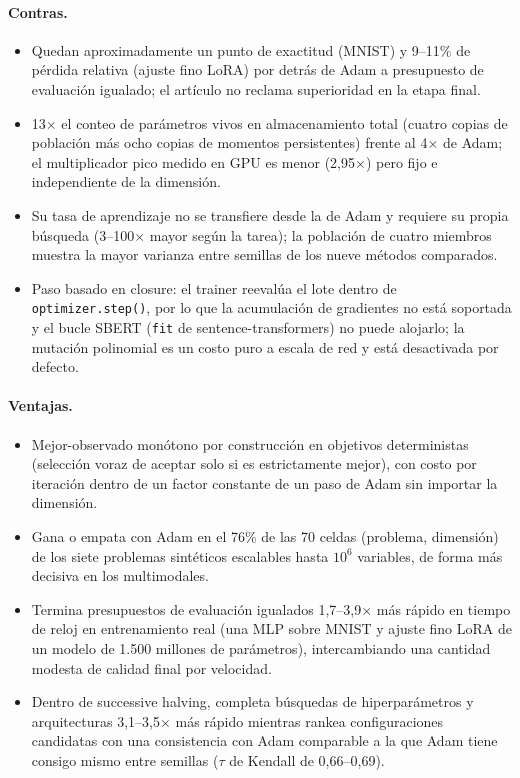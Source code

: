 \paragraph{Contras.}
\begin{itemize}[leftmargin=*]
\item Quedan aproximadamente un punto de exactitud (MNIST) y 9--11\% de pérdida relativa (ajuste fino LoRA) por detrás de Adam a presupuesto de evaluación igualado; el artículo no reclama superioridad en la etapa final.
\item 13$\times$ el conteo de parámetros vivos en almacenamiento total (cuatro copias de población más ocho copias de momentos persistentes) frente al 4$\times$ de Adam; el multiplicador pico medido en GPU es menor (2,95$\times$) pero fijo e independiente de la dimensión.
\item Su tasa de aprendizaje no se transfiere desde la de Adam y requiere su propia búsqueda (3--100$\times$ mayor según la tarea); la población de cuatro miembros muestra la mayor varianza entre semillas de los nueve métodos comparados.
\item Paso basado en closure: el trainer reevalúa el lote dentro de \texttt{optimizer.step()}, por lo que la acumulación de gradientes no está soportada y el bucle SBERT (\texttt{fit} de sentence-transformers) no puede alojarlo; la mutación polinomial es un costo puro a escala de red y está desactivada por defecto.
\end{itemize}

\paragraph{Ventajas.}
\begin{itemize}[leftmargin=*]
\item Mejor-observado monótono por construcción en objetivos deterministas (selección voraz de aceptar solo si es estrictamente mejor), con costo por iteración dentro de un factor constante de un paso de Adam sin importar la dimensión.
\item Gana o empata con Adam en el 76\% de las 70 celdas (problema, dimensión) de los siete problemas sintéticos escalables hasta $10^6$ variables, de forma más decisiva en los multimodales.
\item Termina presupuestos de evaluación igualados 1,7--3,9$\times$ más rápido en tiempo de reloj en entrenamiento real (una MLP sobre MNIST y ajuste fino LoRA de un modelo de 1.500 millones de parámetros), intercambiando una cantidad modesta de calidad final por velocidad.
\item Dentro de successive halving, completa búsquedas de hiperparámetros y arquitecturas 3,1--3,5$\times$ más rápido mientras rankea configuraciones candidatas con una consistencia con Adam comparable a la que Adam tiene consigo mismo entre semillas ($\tau$ de Kendall de 0,66--0,69).
\end{itemize}

